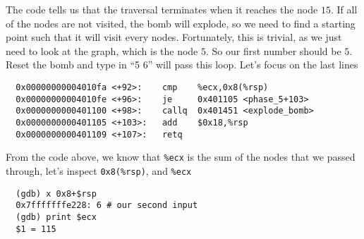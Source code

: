 \begin{center}
\end{center}
The code tells us that the traversal terminates when it reaches the node $15$. If all of the nodes are not visited, the bomb will explode, so we need to find a starting point such that it will visit every nodes. Fortunately, this is trivial, as we just need to look at the graph, which is the node $5$. So our first number should be $5$. Reset the bomb and type in ``5 6'' will pass this loop. Let's focus on the last lines
{\renewcommand\fcolorbox[4][]{\textcolor{cyan}{\strut#4}}
\begin{verbatim}
  0x00000000004010fa <+92>:    cmp    %ecx,0x8(%rsp)
  0x00000000004010fe <+96>:    je     0x401105 <phase_5+103>
  0x0000000000401100 <+98>:    callq  0x401451 <explode_bomb>
  0x0000000000401105 <+103>:   add    $0x18,%rsp
  0x0000000000401109 <+107>:   retq
\end{verbatim}
}\noindent
From the code above, we know that \verb+%ecx+ is the sum of the nodes that we passed through, let's inspect \verb+0x8(%rsp)+, and \verb+%ecx+
{\renewcommand\fcolorbox[4][]{\textcolor{cyan}{\strut#4}}
\begin{verbatim}
  (gdb) x 0x8+$rsp
  0x7fffffffe228: 6 # our second input
  (gdb) print $ecx
  $1 = 115
\end{verbatim}
}\noindent
